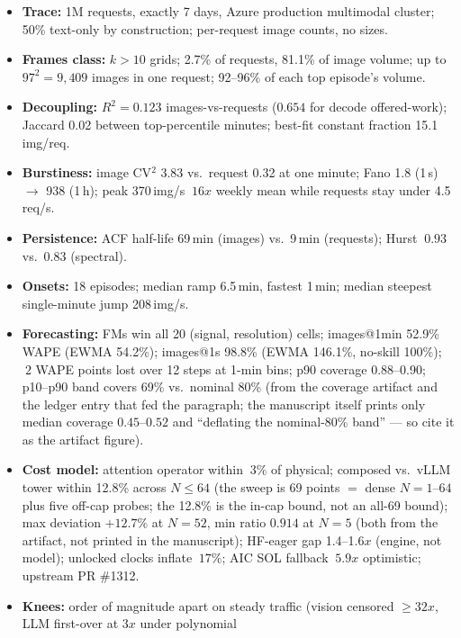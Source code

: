 \documentclass[11pt,a4paper]{article}
\def\times{x}\def\rho{rho}\def\approx{~}\def\leq{<=}\def\geq{>=}%
\def\emph#1{#1}\def\texttt#1{#1}%
\begin{document}
\begin{itemize}
\item \textbf{Trace:} 1M requests, exactly 7 days, Azure production
  multimodal cluster; 50\% text-only by construction; per-request image
  counts, no sizes.
\item \textbf{Frames class:} $k{>}10$ grids; 2.7\% of requests, 81.1\% of
  image volume; up to $97^2 = 9{,}409$ images in one request; 92--96\% of
  each top episode's volume.
\item \textbf{Decoupling:} $R^2 = 0.123$ images-vs-requests ($0.654$ for
  decode offered-work); Jaccard 0.02 between top-percentile minutes;
  best-fit constant fraction 15.1 img/req.
\item \textbf{Burstiness:} image CV$^2$ 3.83 vs.\ request 0.32 at one
  minute; Fano 1.8 (1\,s) $\to$ 938 (1\,h); peak 370\,img/s ${\approx}16\times$
  weekly mean while requests stay under 4.5\,req/s.
\item \textbf{Persistence:} ACF half-life 69\,min (images) vs.\ 9\,min
  (requests); Hurst ${\approx}0.93$ vs.\ $0.83$ (spectral).
\item \textbf{Onsets:} 18 episodes; median ramp 6.5\,min, fastest 1\,min;
  median steepest single-minute jump 208\,img/s.
\item \textbf{Forecasting:} FMs win all 20 (signal, resolution) cells;
  images@1min 52.9\% WAPE (EWMA 54.2\%); images@1s 98.8\% (EWMA 146.1\%,
  no-skill 100\%); ${\approx}2$ WAPE
  points lost over 12 steps at 1-min bins; p90 coverage 0.88--0.90; p10--p90 band covers
  69\% vs.\ nominal 80\% (from the coverage artifact and the ledger entry that
  fed the paragraph; the manuscript itself prints only median coverage
  $0.45$--$0.52$ and ``deflating the nominal-80\% band'' --- so cite it as the
  artifact figure).
\item \textbf{Cost model:} attention operator within ${\approx}3\%$ of
  physical; composed vs.\ vLLM tower within 12.8\% across $N{\le}64$
  (the sweep is 69 points $=$ dense $N{=}1$--$64$ \emph{plus} five off-cap
  probes; the 12.8\% is the in-cap bound, not an all-69 bound); max deviation
  $+12.7\%$ at $N{=}52$, min ratio $0.914$ at $N{=}5$ (both from the
  artifact, not printed in the manuscript);
  HF-eager gap 1.4--1.6$\times$ (engine, not model); unlocked
  clocks inflate ${\approx}17\%$; AIC SOL fallback ${\approx}5.9\times$
  optimistic; upstream PR \#1312.
\item \textbf{Knees:} order of magnitude apart on steady traffic (vision
  censored $\ge 32\times$, LLM first-over at $3\times$ \emph{under polynomial
}
\end{itemize}
\end{document}
